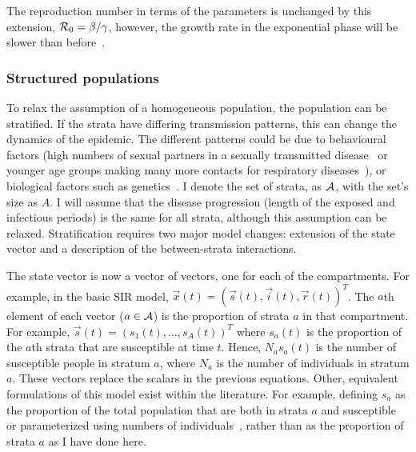 \documentclass[thesis.tex]{subfiles}
\begin{document}
The reproduction number in terms of the parameters is unchanged by this extension, \ie $\mathcal{R}_{0} = \beta / \gamma$, however, the growth rate in the exponential phase will be slower than before~\autocite[41]{keelingModeling}.

\subsubsection{Structured populations} \label{SEIR:sec:structured-populations}

To relax the assumption of a homogeneous population, the population can be stratified.
If the strata have differing transmission patterns, this can change the dynamics of the epidemic.
The different patterns could be due to behavioural factors (\eg high numbers of sexual partners in a sexually transmitted disease~\autocite[69]{keelingModeling} or younger age groups making many more contacts for respiratory diseases~\autocite[176]{andersonInfectious}), or biological factors such as genetics~\autocite[208]{andersonInfectious}.
I denote the set of strata, as $\mathcal{A}$, with the set's size as $A$.
I will assume that the disease progression (\ie length of the exposed and infectious periods) is the same for all strata, although this assumption can be relaxed.
Stratification requires two major  model changes: extension of the state vector and a description of the between-strata interactions.

The state vector is now a vector of vectors, one for each of the compartments.
For example, in the basic SIR model, $\vec{x}(t) = (\vec{s}(t), \vec{i}(t), \vec{r}(t))^T$.
The $a$th element of each vector ($a \in \mathcal{A}$) is the proportion of strata $a$ in that compartment.
For example, $\vec{s}(t) = (s_1(t), \dots, s_A(t))^T$ where $s_a(t)$ is the proportion of the $a$th strata that are susceptible at time $t$.
Hence, $N_a s_a(t)$ is the number of susceptible people in stratum $a$, where $N_a$ is the number of individuals in stratum $a$.
These vectors replace the scalars in the previous equations.
Other, equivalent formulations of this model exist within the literature.
For example, defining $s_a$ as the proportion of the total population that are both in strata $a$ and susceptible or parameterized using numbers of individuals~\autocite[57]{keelingModeling}, rather than as the proportion of strata $a$ as I have done here.
\end{document}
